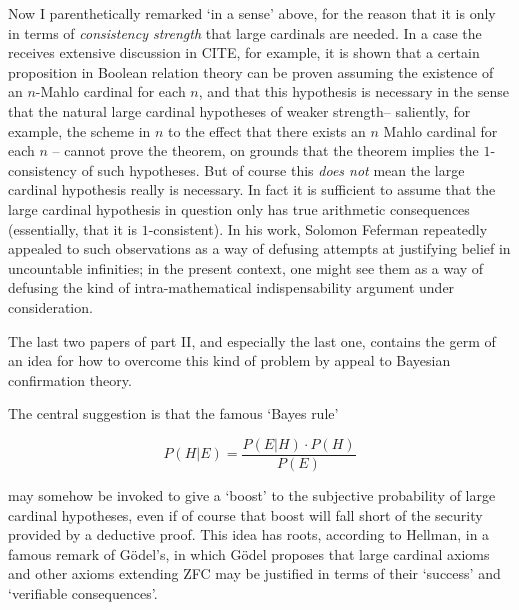 \documentclass{amsart}
\theoremstyle{definition}
\begin{document}
Now I parenthetically remarked `in a sense' above, for the reason that
it is only in terms of \emph{consistency strength} that large cardinals are needed. 
In a case the receives extensive discussion in CITE, for example, it is shown 
that a certain proposition in Boolean relation theory can be proven assuming 
the existence of an $n$-Mahlo cardinal for each $n$, and that this hypothesis 
is necessary in the sense that the natural large cardinal hypotheses of 
weaker strength-- saliently, for example, the scheme in $n$ to the effect 
that there exists an $n$ Mahlo cardinal for each $n$ -- cannot prove the theorem, 
on grounds that the theorem implies the $1$-consistency of such hypotheses. But 
of course this \emph{does not} mean the large cardinal hypothesis really is necessary.
In fact it is sufficient to assume that the large cardinal hypothesis in question 
only has true arithmetic consequences (essentially, that it is $1$-consistent). 
In his work, Solomon Feferman repeatedly appealed to such observations 
as a way of defusing attempts at justifying belief in uncountable infinities;
in the present context, one might see them as a way of defusing the kind of 
intra-mathematical indispensability argument under consideration.

The last two papers of part II, and especially the last one, contains the germ
of an idea for how to overcome this kind of problem by appeal to Bayesian 
confirmation theory.

The central suggestion is that the famous `Bayes rule'

\begin{equation}
P(H|E) = \frac{P(E|H)\cdot P(H)}{P(E)}
\end{equation}

may somehow be invoked to give a `boost' to the subjective probability 
of large cardinal hypotheses, even if of course that boost will fall 
short of the security provided by a deductive proof. 
This idea has roots, according to Hellman, in a famous remark of G\"odel's, 
in which G\"odel proposes that large cardinal axioms and other axioms 
extending ZFC may be justified in terms of their `success' and 
`verifiable consequences'.
\end{document}
